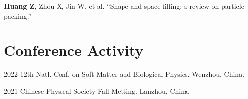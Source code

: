 \documentclass[12pt,letterpaper]{report}
\begin{document}
	\begin{tablist}
		
		\textbf{Huang Z}, Zhou X, Jin W, et al. \enquote{Shape and space filling: a review on particle packing.}
		
		
	\end{tablist}
	



   \section*{Conference Activity}

    \begin{tablist}

        \item[2022] \tab{}12th Natl. Conf. on Soft Matter and Biological Physics. Wenzhou, China.

        \item[2021] \tab{}Chinese Physical Society Fall Metting. Lanzhou, China.

    \end{tablist}
\end{document}
